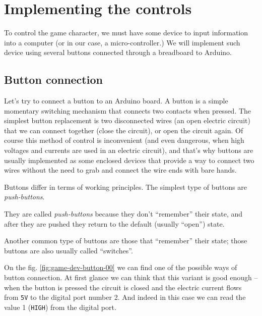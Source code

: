 \documentclass[../sparc.tex]{subfiles}
\begin{document}
\section{Implementing the controls}
\label{section:game-dev-controls}

To control the game character, we must have some device to input information
into a computer (or in our case, a micro-controller.)  We will implement such
device using several buttons connected through a breadboard to Arduino.

\subsection{Button connection}

Let's try to connect a button to an Arduino board.  A button is a simple
momentary switching mechanism that connects two contacts when pressed.  The
simplest button replacement is two disconnected wires (an open electric circuit)
that we can connect together (close the circuit), or open the circuit again.  Of
course this method of control is inconvenient (and even dangerous, when high
voltages and currents are used in an electric circuit), and that's why buttons
are usually implemented as some enclosed devices that provide a way to connect
two wires without the need to grab and connect the wire ends with bare hands.

Buttons differ in terms of working principles.  The simplest type of buttons are
\emph{push-buttons}.

They are called \emph{push-buttons} because they don't ``remember'' their state,
and after they are pushed they return to the default (usually ``open'') state.

Another common type of buttons are those that ``remember'' their state; those
buttons are also usually called ``switches''.

On the fig. \ref{fig:game-dev-button-00} we can find one of the possible ways of
button connection.  At first glance we can think that this variant is good
enough -- when the button is pressed the circuit is closed and the electric
current flows from \texttt{5V} to the digital port number 2.  And indeed in this
case we can read the value 1 (\texttt{HIGH}) from the digital port.
\end{document}

